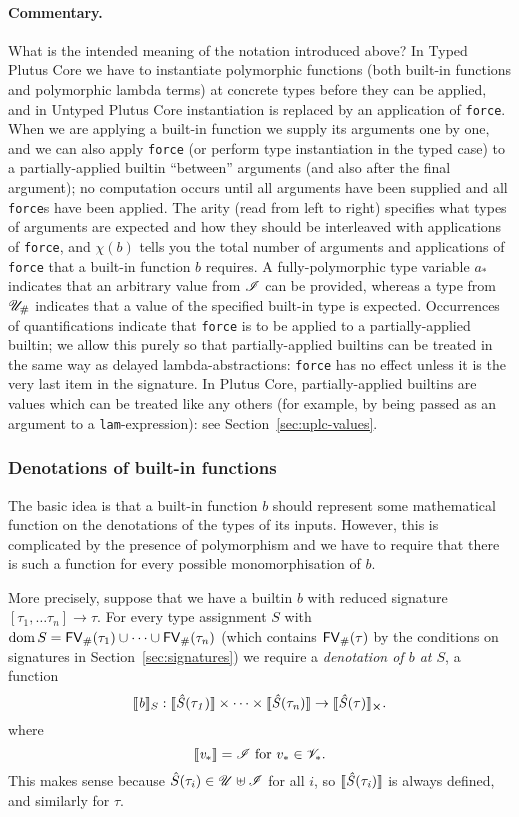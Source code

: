 \paragraph{Commentary.} What is the intended meaning of the notation introduced
above?  In Typed Plutus Core we have to instantiate polymorphic functions (both
built-in functions and polymorphic lambda terms) at concrete types before they
can be applied, and in Untyped Plutus Core instantiation is replaced by an
application of \texttt{force}.  When we are applying a built-in function we
supply its arguments one by one, and we can also apply \texttt{force} (or
perform type instantiation in the typed case) to a partially-applied builtin
``between'' arguments (and also after the final argument); no computation occurs
until all arguments have been supplied and all \texttt{force}s have been
applied. The arity (read from left to right) specifies what types of arguments
are expected and how they should be interleaved with applications of
\texttt{force}, and $\chi(b)$ tells you the total number of arguments and
applications of \texttt{force} that a built-in function $b$ requires. A
fully-polymorphic type variable $a_*$ indicates that an arbitrary value from
$\mathscr{I}$ can be provided, whereas a type from ${\mathscr{U}_{\#}}$ indicates that a value
of the specified built-in type is expected. Occurrences of quantifications
indicate that \texttt{force} is to be applied to a partially-applied builtin; we
allow this purely so that partially-applied builtins can be treated in the same
way as delayed lambda-abstractions: \texttt{force} has no effect unless it is
the very last item in the signature.  In Plutus Core, partially-applied
builtins are values which can be treated like any others (for example, by being
passed as an argument to a \texttt{lam}-expression): see
Section~\ref{sec:uplc-values}.


\subsubsection{Denotations of built-in functions}
\label{sec:builtin-denotations}
The basic idea is that a built-in function $b$ should represent some
mathematical function on the denotations of the types of its inputs.  However,
this is complicated by the presence of polymorphism and we have to require that
there is such a function for every possible monomorphisation of $b$.

More precisely, suppose that we have a builtin $b$ with reduced signature
$[\tau_1, \ldots \tau_n] \rightarrow \tau$.  For every type assignment $S$ with
$\operatorname{dom} S = \mathsf{FV}_{\#}(\tau_1) \cup \cdots \cup \mathsf{FV}_{\#}(\tau_n)$ (which contains $\mathsf{FV}_{\#}(\tau)$ by
the conditions on signatures in Section~\ref{sec:signatures}) we require a
\textit{denotation of $b$ at $S$}, a function
$$
\denote{b}_S: \denote{\Sext(\tau_1)} \times \cdots \times \denote{\Sext(\tau_n)} \rightarrow \withError{\denote{\Sext(\tau)}}.
$$%
\noindent where
$$
\llbracket\mathit{v_*}\rrbracket = \mathscr{I} \text{\ for $v_* \in \mathscr{V}_*$}.
$$
\noindent This makes sense because $\hat{S}(\tau_i) \in \mathscr{U} \uplus
\mathscr{I}$ for all $i$, so $\llbracket\mathit{\hat{S}(\tau_i)}\rrbracket$ is always defined,
and similarly for $\tau$.

